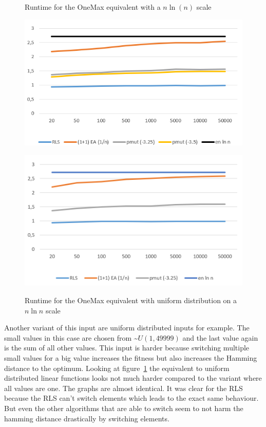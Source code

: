\begin{figure}[h]
      \centering
      \begin{minipage}[b]{0.45\textwidth}
            \caption{Runtime for the OneMax equivalent with a $n\ln(n)$ scale}
            \includegraphics[width=\textwidth]{figures/images/oneMaxMultipleN.png}\label{fig:onemaxNlogNBound}
      \end{minipage}
      \hspace{0.75cm}
      \begin{minipage}[b]{0.45\textwidth}
            \caption{Runtime for the OneMax equivalent with uniform distribution on a $n\ln n$ scale}
            \includegraphics[width=\textwidth]{figures/images/oneMaxUniformMultipleN.png}\label{fig:onemaxUniformNlogNBound}
      \end{minipage}
\end{figure}

Another variant of this input are uniform distributed inputs for example.
The small values in this case are chosen from \textasciitilde$U(1,49999)$ and the last value again is the sum of all other values.
This input is harder because switching multiple small values for a big value increases the fitness but also increases the Hamming distance to the optimum. Looking at figure~\ref{fig:onemaxUniformNlogNBound} the equivalent to uniform distributed linear functions looks not much harder compared to the variant where all values are one.
The graphs are almost identical.
It was clear for the RLS because the RLS can't switch elements which leads to the exact same behaviour.
But even the other algorithms that are able to switch seem to not harm the hamming distance drastically by switching elements.

